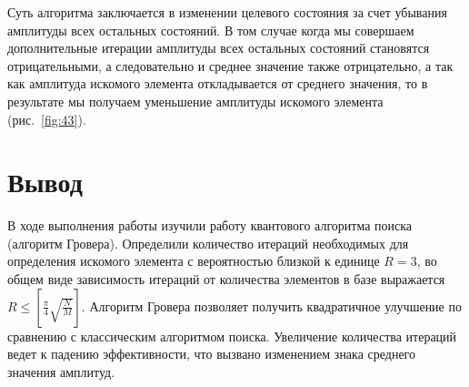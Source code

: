 \documentclass{article}
\begin{document}
Суть алгоритма заключается в изменении целевого состояния за счет  убывания
амплитуды всех остальных состояний. В том случае когда мы совершаем
дополнительные итерации амплитуды всех остальных состояний становятся
отрицательными, а следовательно и среднее значение также отрицательно, а так
как амплитуда искомого элемента откладывается от среднего значения, то в
результате мы получаем уменьшение амплитуды искомого элемента
(рис.~\ref{fig:43}).

\section{Вывод}

В ходе выполнения работы изучили работу квантового алгоритма поиска (алгоритм
Гровера). Определили количество итераций необходимых для определения искомого
элемента с вероятностью близкой к единице $R = 3$, во общем виде зависимость
итераций от количества элементов в базе выражается $R \leqslant
\left[\frac{\pi}{4} \sqrt{\frac{N}{M}}\right]$. Алгоритм Гровера позволяет
получить квадратичное улучшение по сравнению с классическим алгоритмом поиска.
Увеличение количества итераций ведет к падению эффективности, что вызвано
изменением знака среднего значения амплитуд.
\end{document}
